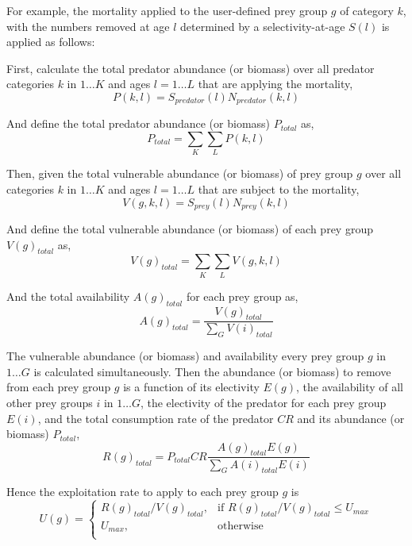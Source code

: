For example, the mortality applied to the user-defined prey group $g$ of category $k$, with the numbers removed at age $l$ determined by a selectivity-at-age $S(l)$ is applied as follows:

First, calculate the total predator abundance (or biomass) over all predator categories $k$ in $1 \ldots K$ and ages $l = 1 \ldots L$ that are applying the mortality,
\begin{equation}
  P(k,l) = S_{predator}(l) N_{predator}(k,l)
\end{equation}

And define the total predator abundance (or biomass) $P_{total}$ as,
\begin{equation}
  P_{total}  = \sum\limits_K {\sum\limits_L {P(k,l)}} 
\end{equation}

Then, given the total vulnerable abundance (or biomass) of prey group $g$ over all categories $k$ in $1 \ldots K$ and ages $l = 1 \ldots L$ that are subject to the mortality,
\begin{equation}
  V(g,k,l) = S_{prey}(l) N_{prey}(k,l)
\end{equation}

And define the total vulnerable abundance (or biomass) of each prey group $V(g)_{total}$ as,
\begin{equation}
  V(g)_{total}  = \sum\limits_K {\sum\limits_L {V(g,k,l)}} 
\end{equation}

And the total availability $A(g)_{total}$ for each prey group as,
\begin{equation}
  A(g)_{total} = \frac{V(g)_{total}}{\sum\limits_G {V(i)_{total}}}
\end{equation}

The vulnerable abundance (or biomass) and availability every prey group $g$ in $1 \ldots G$ is calculated simultaneously. Then the abundance (or biomass) to remove from each prey group $g$ is a function of its electivity $E(g)$, the availability of all other prey groups $i$ in $1 \ldots G$, the electivity of the predator for each prey group $E(i)$, and the total consumption rate of the predator $CR$ and its abundance (or biomass) $P_{total}$,
\begin{equation}
  R(g)_{total}=P_{total} CR \frac{A(g)_{total} E(g)}{\sum\limits_G {A(i)_{total} E(i)}}
\end{equation}

Hence the exploitation rate to apply to each prey group $g$ is 
\begin{equation}
U(g) = \begin{cases}
  R(g)_{total}/V(g)_{total}, & \text{if $R(g)_{total}/V(g)_{total} \leq U_{max}$} \\
  U_{max}, & \text{otherwise}\\ 
  \end{cases} 
\end{equation}

